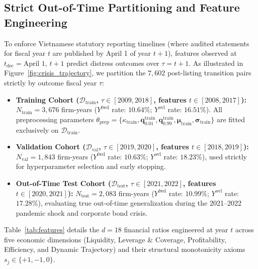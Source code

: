 \documentclass[pdflatex,sn-mathphys-num,twocolumn]{sn-jnl}
\theoremstyle{thmstyleone}
\theoremstyle{thmstyletwo}
\theoremstyle{thmstylethree}
\begin{document}
\subsection{Strict Out-of-Time Partitioning and Feature Engineering}
To enforce Vietnamese statutory reporting timelines (where audited statements for fiscal year $t$ are published by April 1 of year $t+1$), features observed at $t_{\text{dec}} = \text{April 1, } t+1$ predict distress outcomes over $\tau = t+1$. As illustrated in Figure~\ref{fig:crisis_trajectory}, we partition the $7,602$ post-listing transition pairs strictly by outcome fiscal year $\tau$:
\begin{itemize}
    \item \textbf{Training Cohort ($\mathcal{D}_{\text{train}}$, $\tau \in [2009, 2018]$, features $t \in [2008, 2017]$):} $N_{\text{train}} = 3,676$ firm-years ($Y^{\text{fwd}}$ rate: $10.64\%$; $Y^{\text{ovl}}$ rate: $16.51\%$). All preprocessing parameters $\theta_{\text{prep}} = \{\kappa_{\text{train}}, \mathbf{q}_{0.01}^{\text{train}}, \mathbf{q}_{0.99}^{\text{train}}, \boldsymbol{\mu}_{\text{train}}, \boldsymbol{\sigma}_{\text{train}}\}$ are fitted exclusively on $\mathcal{D}_{\text{train}}$.
    \item \textbf{Validation Cohort ($\mathcal{D}_{\text{val}}$, $\tau \in [2019, 2020]$, features $t \in [2018, 2019]$):} $N_{\text{val}} = 1,843$ firm-years ($Y^{\text{fwd}}$ rate: $10.63\%$; $Y^{\text{ovl}}$ rate: $18.23\%$), used strictly for hyperparameter selection and early stopping.
    \item \textbf{Out-of-Time Test Cohort ($\mathcal{D}_{\text{test}}$, $\tau \in [2021, 2022]$, features $t \in [2020, 2021]$):} $N_{\text{test}} = 2,083$ firm-years ($Y^{\text{fwd}}$ rate: $10.99\%$; $Y^{\text{ovl}}$ rate: $17.28\%$), evaluating true out-of-time generalization during the 2021--2022 pandemic shock and corporate bond crisis.
\end{itemize}

Table~\ref{tab:features} details the $d=18$ financial ratios engineered at year $t$ across five economic dimensions (Liquidity, Leverage \& Coverage, Profitability, Efficiency, and Dynamic Trajectory) and their structural monotonicity axioms $s_j \in \{+1, -1, 0\}$.
\end{document}
